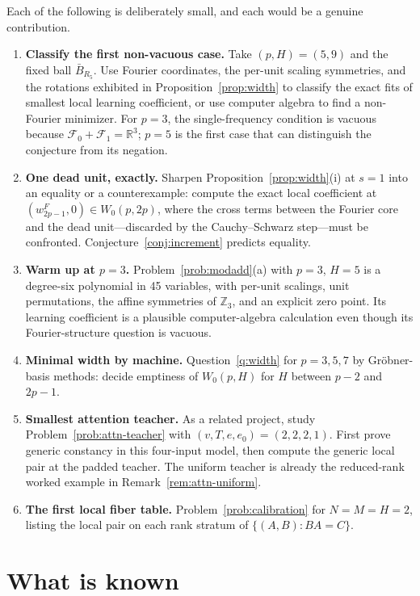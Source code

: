 \documentclass[11pt]{amsart}
\theoremstyle{plain}
\theoremstyle{definition}
\newcommand{\R}{\mathbb{R}}
\newcommand{\Z}{\mathbb{Z}}
\begin{document}
Each of the following is deliberately small, and each would be a genuine contribution.

\begin{enumerate}
\item \textbf{Classify the first non-vacuous case.} Take $(p,H)=(5,9)$ and the fixed ball $\bar B_{R_5}$. Use Fourier coordinates, the per-unit scaling symmetries, and the rotations exhibited in Proposition~\ref{prop:width} to classify the exact fits of smallest local learning coefficient, or use computer algebra to find a non-Fourier minimizer. For $p=3$, the single-frequency condition is vacuous because $\mathcal F_0+\mathcal F_1=\R^3$; $p=5$ is the first case that can distinguish the conjecture from its negation.
\item \textbf{One dead unit, exactly.} Sharpen Proposition~\ref{prop:width}(i) at $s = 1$ into an equality or a counterexample: compute the exact local coefficient at $(w^F_{2p-1}, 0) \in W_0(p, 2p)$, where the cross terms between the Fourier core and the dead unit---discarded by the Cauchy--Schwarz step---must be confronted. Conjecture~\ref{conj:increment} predicts equality.
\item \textbf{Warm up at $p = 3$.} Problem~\ref{prob:modadd}(a) with $p = 3$, $H = 5$ is a degree-six polynomial in 45 variables, with per-unit scalings, unit permutations, the affine symmetries of $\Z_3$, and an explicit zero point. Its learning coefficient is a plausible computer-algebra calculation even though its Fourier-structure question is vacuous.
\item \textbf{Minimal width by machine.} Question~\ref{q:width} for $p = 3, 5, 7$ by Gr\"obner-basis methods: decide emptiness of $W_0(p, H)$ for $H$ between $p-2$ and $2p-1$.
\item \textbf{Smallest attention teacher.} As a related project, study Problem~\ref{prob:attn-teacher} with $(v,T,e,e_0)=(2,2,2,1)$. First prove generic constancy in this four-input model, then compute the generic local pair at the padded teacher. The uniform teacher is already the reduced-rank worked example in Remark~\ref{rem:attn-uniform}.
\item \textbf{The first local fiber table.} Problem~\ref{prob:calibration} for $N=M=H=2$, listing the local pair on each rank stratum of $\{(A,B):BA=C\}$.
\end{enumerate}

\section{What is known}\label{sec:known}
\end{document}
